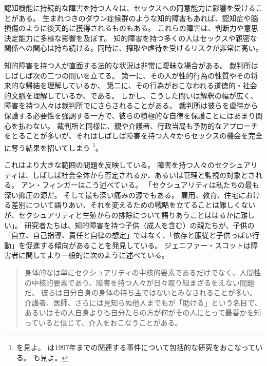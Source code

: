 \documentclass[paper=a4,book,openany]{jlreq}
\begin{document}
認知機能に持続的な障害を持つ人々は、セックスへの同意能力に影響を受けることがある。
生まれつきのダウン症候群のような知的障害もあれば、認知症や脳損傷のように後天的に獲得されるものもある。
これらの障害は、判断力や意思決定能力に多様な影響を及ぼす。
知的障害を持つ多くの人はセックスや親密な関係への関心は持ち続ける。同時に、搾取や虐待を受けるリスクが非常に高い\citep{justice16:_crime_person_disab}。

知的障害を持つ人が直面する法的な状況は非常に曖昧な場合がある。
裁判所はしばしば次の二つの問いを立てる。
第一に、その人が性的行為の性質やその将来的な帰結を理解しているか、
第二に、その行為がおこなわれる道徳的・社会的文脈を理解しているか、である。
しかし、こうした問いは解釈の幅が広く、障害を持つ人々は裁判所でにさらされることがある。
裁判所は彼らを虐待から保護する必要性を強調する一方で、彼らの積極的な自律を保護ことにはあまり関心を払わない。
裁判所と同様に、親や介護者、行政当局も予防的なアプローチをとることが多いが、それはしばしば障害を持つ人々からセックスの機会を完全に奪う結果を招いてしまう\nocite{appel10:_sex_right_disab} \footnote{\citet{appel10:_sex_right_disab}を見よ。
\citet{denno97:_sexual_rape_mental_retar}は1997年までの関連する事件について包括的な研究をおこなっている。
\citet[p.86]{kulick15:_lonel_its_oppos}も見よ。
}。

これはより大きな範囲の問題を反映している。
障害を持つ人々のセクシュアリティは、しばしば社会全体から否定されるか、あるいは管理と監視の対象とされる。
アン・フィンガーはこう述べている。
「セクシュアリティは私たちの最も深い抑圧の源だ。
そして最も深い痛みの源でもある。
雇用、教育、住宅における差別について語りあい、それを変えるための戦略を立てることは難しくないが、セクシュアリティと生殖からの排除について語りあうことははるかに難しい」\citep[p.9]{finger92:_forbid_fruit}。
研究者たちは、知的障害を持つ子供（成人を含む）の親たちが、子供の「自立、自己指導、責任と自律の想定」ではなく、「依存と服従と子供っぽい行動」を促進する傾向があることを発見している\citep[p.196]{mill10:_negot_auton_famil}。
ジェニファー・スコットは障害者に関してより一般的に次のように述べている。

\begin{quote}
身体的なは単にセクシュアリティの中核的要素であるだけでなく、人間性の中核的要素であり、障害を持つ人々が日々取り組まざるをえない問題だ。
彼らは自分自身の身体の持ち主ではないとみなされることが多い。
介護者、医師、さらには見知らぬ他人までもが「助ける」という名目で、あるいはその人自身よりも自分たちの方が何がその人にとって最善かを知っていると信じて、介入をおこなうことがある。
\citep[p.218]{scott15:_can_disab_peopl_have_sex}
\end{quote}
\end{document}
